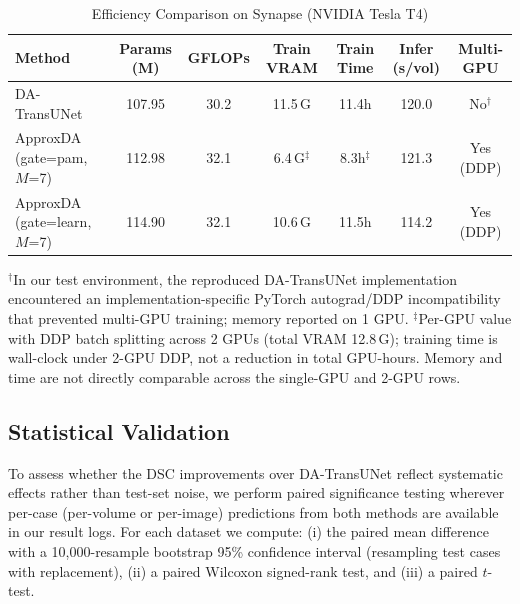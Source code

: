 \begin{table}[ht]
  \caption{Efficiency Comparison on Synapse (NVIDIA Tesla T4)}
  \label{tab:efficiency}
  \centering
  \setlength{\tabcolsep}{5pt}
  \begin{tabular}{lcccccc}
    \toprule
    Method & Params (M) & GFLOPs & Train VRAM & Train Time & Infer (s/vol) & Multi-GPU \\
    \midrule
    DA-TransUNet~\cite{sun2024datransunet} & 107.95 & 30.2 & 11.5\,G & 11.4h & 120.0 & No$^\dagger$ \\
    \midrule
    ApproxDA (gate=pam, $M$=7)  & 112.98 & 32.1 & 6.4\,G$^\ddagger$ & 8.3h$^\ddagger$ & 121.3 & Yes (DDP) \\
    ApproxDA (gate=learn, $M$=7) & 114.90 & 32.1 & 10.6\,G & 11.5h & 114.2 & Yes (DDP) \\
    \bottomrule
  \end{tabular}
  \par\vspace{5pt}
  \parbox{\textwidth}{\footnotesize $^\dagger$In our test environment, the reproduced DA-TransUNet implementation encountered an implementation-specific PyTorch autograd/DDP incompatibility that prevented multi-GPU training; memory reported on 1 GPU. $^\ddagger$Per-GPU value with DDP batch splitting across 2 GPUs (total VRAM 12.8\,G); training time is wall-clock under 2-GPU DDP, not a reduction in total GPU-hours. Memory and time are not directly comparable across the single-GPU and 2-GPU rows.}
\end{table}

\subsection{Statistical Validation}
\label{sec:stat_validation}

To assess whether the DSC improvements over DA-TransUNet reflect systematic effects rather than test-set noise, we perform paired significance testing wherever per-case (per-volume or per-image) predictions from both methods are available in our result logs. For each dataset we compute: (i) the paired mean difference with a 10{,}000-resample bootstrap 95\% confidence interval (resampling test cases with replacement), (ii) a paired Wilcoxon signed-rank test, and (iii) a paired $t$-test.

